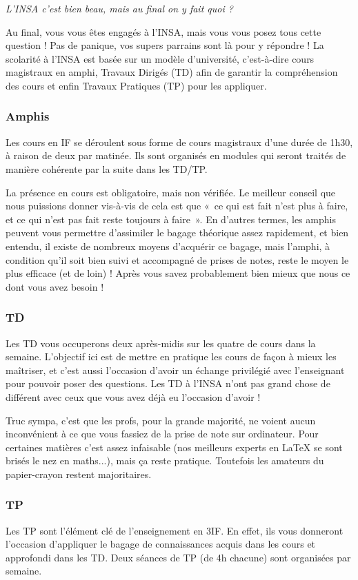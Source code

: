 \begin{citationii}
\emph{L'INSA c'est bien beau, mais au final on y fait quoi ?}
\end{citationii}
Au final, vous vous êtes engagés à l'INSA, mais vous vous posez tous cette
question !
Pas de panique, vos supers parrains sont là pour y répondre !
La scolarité à l'INSA est basée sur un modèle d'université, c'est-à-dire cours
magistraux en amphi, Travaux Dirigés (TD) afin de garantir la compréhension des
cours et enfin Travaux Pratiques (TP) pour les appliquer.

\subsubsection{Amphis}
Les cours en IF se déroulent sous forme de cours magistraux d'une durée de
1h30, à raison de deux par matinée. Ils sont organisés en modules qui
seront traités de manière cohérente par la suite dans les TD/TP.

La présence en cours est obligatoire, mais non vérifiée. Le meilleur conseil que
nous puissions donner vis-à-vis de cela est que «~ce qui est fait n'est plus à
faire, et ce qui n'est pas fait reste toujours à faire~». En d'autres termes, les
amphis peuvent vous permettre d'assimiler le bagage théorique assez rapidement, et bien
entendu, il existe de nombreux moyens d'acquérir ce bagage, mais l'amphi, à
condition qu'il soit bien suivi et accompagné de prises de notes, reste le moyen le plus 
efficace (et de loin) ! Après vous savez probablement bien mieux que nous ce dont vous avez besoin !
\subsubsection{TD}
Les TD vous occuperons deux après-midis sur les quatre de cours dans la semaine.
L'objectif ici est de mettre en pratique les cours de façon à mieux les
maîtriser, et c'est aussi l'occasion d'avoir un échange privilégié avec
l'enseignant pour pouvoir poser des questions. Les TD à l'INSA n'ont pas grand chose
de différent avec ceux que vous avez déjà eu l'occasion d'avoir ! 

Truc sympa, c'est que les profs, pour la grande majorité, ne voient aucun
inconvénient à ce que vous fassiez de la prise de note sur ordinateur. Pour
certaines matières c'est assez infaisable (nos meilleurs experts en \LaTeX{} se
sont brisés le nez en maths...), mais ça reste pratique. Toutefois les
amateurs du papier-crayon restent majoritaires.
\subsubsection{TP}
Les TP sont l'élément clé de l'enseignement en 3IF. En effet, ils
vous donneront l'occasion d'appliquer le bagage de connaissances acquis dans
les cours et approfondi dans les TD. Deux séances de TP (de 4h chacune) sont
organisées par semaine.

